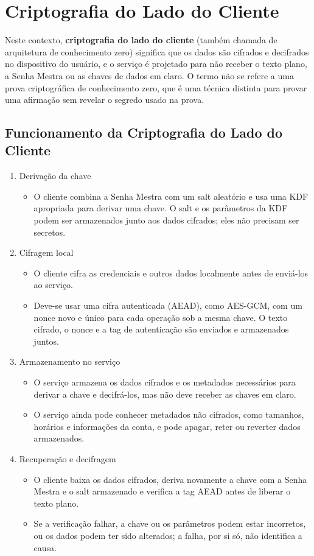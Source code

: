\section{Criptografia do Lado do Cliente}

Neste contexto, \textbf{criptografia do lado do cliente} (também chamada de arquitetura de conhecimento zero) significa que os dados são cifrados e decifrados no dispositivo do usuário, e o serviço é projetado para não receber o texto plano, a Senha Mestra ou as chaves de dados em claro. O termo não se refere a uma prova criptográfica de conhecimento zero, que é uma técnica distinta para provar uma afirmação sem revelar o segredo usado na prova.

\subsection{Funcionamento da Criptografia do Lado do Cliente}

\begin{enumerate}
	\item Derivação da chave
		\begin{itemize}
			\item O cliente combina a Senha Mestra com um salt aleatório e usa uma KDF apropriada para derivar uma chave. O salt e os parâmetros da KDF podem ser armazenados junto aos dados cifrados; eles não precisam ser secretos.
		\end{itemize}
	\item Cifragem local
		\begin{itemize}
			\item O cliente cifra as credenciais e outros dados localmente antes de enviá-los ao serviço.
			\item Deve-se usar uma cifra autenticada (AEAD), como AES-GCM, com um nonce novo e único para cada operação sob a mesma chave. O texto cifrado, o nonce e a tag de autenticação são enviados e armazenados juntos.
		\end{itemize}
	\item Armazenamento no serviço
		\begin{itemize}
			\item O serviço armazena os dados cifrados e os metadados necessários para derivar a chave e decifrá-los, mas não deve receber as chaves em claro.
			\item O serviço ainda pode conhecer metadados não cifrados, como tamanhos, horários e informações da conta, e pode apagar, reter ou reverter dados armazenados.
		\end{itemize}
	\item Recuperação e decifragem
		\begin{itemize}
			\item O cliente baixa os dados cifrados, deriva novamente a chave com a Senha Mestra e o salt armazenado e verifica a tag AEAD antes de liberar o texto plano.
			\item Se a verificação falhar, a chave ou os parâmetros podem estar incorretos, ou os dados podem ter sido alterados; a falha, por si só, não identifica a causa.
		\end{itemize}
\end{enumerate}

